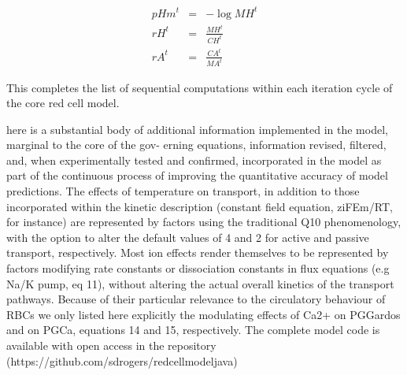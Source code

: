 \documentclass[a4paper]{article}
\newcommand{\med}[1]{M#1}
\newcommand{\cell}[1]{C#1}
\newcommand{\MA}{\med{A}}
\newcommand{\MH}{\med{H}}
\newcommand{\CH}{\cell{H}}
\newcommand{\CA}{\cell{A}}
\begin{document}
\begin{eqnarray}
pHm^t&=& -\log\MH^t\\
rH^t &=&\frac{\MH^t}{\CH^t} \\
rA^t &=& \frac{\CA^t}{\MA^t} 
\end{eqnarray}

This completes the list of sequential computations within each iteration cycle of the core red cell model.    

here is a substantial body of additional information implemented in the model, marginal to the core of the gov-
erning equations, information revised, filtered, and, when experimentally tested and confirmed, incorporated in the
model as part of the continuous process of improving the quantitative accuracy of model predictions. The effects of
temperature on transport, in addition to those incorporated within the kinetic description (constant field equation,
ziFEm/RT, for instance) are represented by factors using the traditional Q10 phenomenology, with the option to alter
the default values of 4 and 2 for active and passive transport, respectively. Most ion effects render themselves to
be represented by factors modifying rate constants or dissociation constants in flux equations (e.g Na/K pump, eq
11), without altering the actual overall kinetics of the transport pathways. Because of their particular relevance to
the circulatory behaviour of RBCs we only listed here explicitly the modulating effects of Ca2+ on PGGardos and on
PGCa, equations 14 and 15, respectively. The complete model code is available with open access in the repository
(https://github.com/sdrogers/redcellmodeljava)
\end{document}

